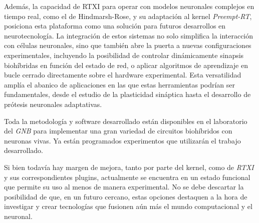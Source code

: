 Además, la capacidad de RTXI para operar con modelos neuronales complejos en tiempo real, como el de Hindmarsh-Rose, y su adaptación al kernel \textit{Preempt-RT}, posiciona esta plataforma como una solución para futuros desarrollos en neurotecnología. La integración de estos sistemas no solo simplifica la interacción con células neuronales, sino que también abre la puerta a nuevas configuraciones experimentales, incluyendo la posibilidad de controlar dinámicamente sinapsis biohíbridas en función del estado de red, o aplicar algoritmos de aprendizaje en bucle cerrado directamente sobre el hardware experimental. Esta versatilidad amplía el abanico de aplicaciones en las que estas herramientas podrían ser fundamentales, desde el estudio de la plasticidad sináptica hasta el desarrollo de prótesis neuronales adaptativas.

Toda la metodología y software desarrollado están disponibles en el laboratorio del \textit{GNB} para implementar una gran variedad de circuitos biohíbridos con neuronas vivas. Ya están programados experimentos que utilizarán el trabajo desarrollado.

Si bien todavía hay margen de mejora, tanto por parte del kernel, como de \textit{RTXI} y sus correspondientes plugins, actualmente se encuentra en un estado funcional que permite su uso al menos de manera experimental. No se debe descartar la posibilidad de que, en un futuro cercano, estas opciones destaquen a la hora de investigar y crear tecnologías que fusionen aún más el mundo computacional y el neuronal.
